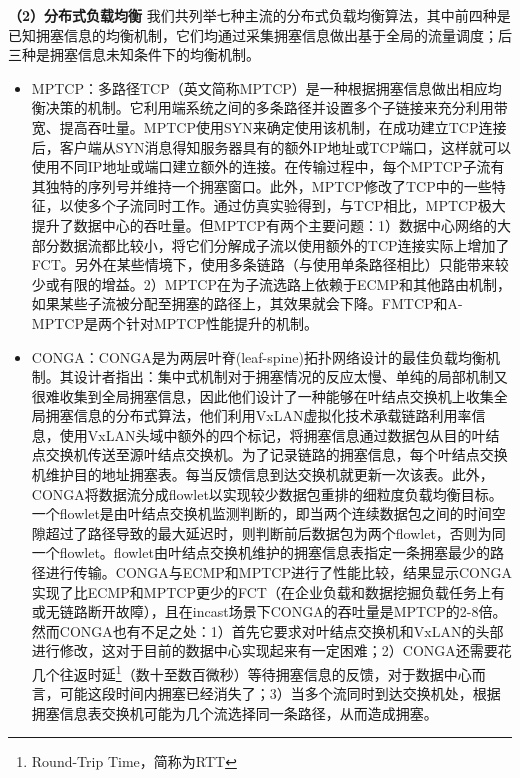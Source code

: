 \textbf{（2）分布式负载均衡}
我们共列举七种主流的分布式负载均衡算法，其中前四种是已知拥塞信息的均衡机制，它们均通过采集拥塞信息做出基于全局的流量调度；后三种是拥塞信息未知条件下的均衡机制。
\begin{itemize}
    \item MPTCP\cite{raiciu2011MPTCP}：多路径TCP（英文简称MPTCP）是一种根据拥塞信息做出相应均衡决策的机制。它利用端系统之间的多条路径并设置多个子链接来充分利用带宽、提高吞吐量。MPTCP使用SYN来确定使用该机制，在成功建立TCP连接后，客户端从SYN消息得知服务器具有的额外IP地址或TCP端口，这样就可以使用不同IP地址或端口建立额外的连接。在传输过程中，每个MPTCP子流有其独特的序列号并维持一个拥塞窗口。此外，MPTCP修改了TCP中的一些特征，以使多个子流同时工作。\cite{raiciu2011MPTCP}通过仿真实验得到，与TCP相比，MPTCP极大提升了数据中心的吞吐量。但MPTCP有两个主要问题：1）数据中心网络的大部分数据流都比较小，将它们分解成子流以使用额外的TCP连接实际上增加了FCT。另外在某些情境下，使用多条链路（与使用单条路径相比）只能带来较少或有限的增益。2）MPTCP在为子流选路上依赖于ECMP和其他路由机制，如果某些子流被分配至拥塞的路径上，其效果就会下降。FMTCP\cite{cui2015fmtcp}和A-MPTCP\cite{Coudron2013AMPTCP}是两个针对MPTCP性能提升的机制。
    \item CONGA\cite{alizadeh2014CONGA}：CONGA是为两层叶脊(leaf-spine)拓扑网络设计的最佳负载均衡机制。其设计者指出：集中式机制对于拥塞情况的反应太慢、单纯的局部机制又很难收集到全局拥塞信息，因此他们设计了一种能够在叶结点交换机上收集全局拥塞信息的分布式算法，他们利用VxLAN\cite{maha2014VxLAN}虚拟化技术承载链路利用率信息，使用VxLAN头域中额外的四个标记，将拥塞信息通过数据包从目的叶结点交换机传送至源叶结点交换机。为了记录链路的拥塞信息，每个叶结点交换机维护目的地址拥塞表。每当反馈信息到达交换机就更新一次该表。此外，CONGA将数据流分成flowlet以实现较少数据包重排的细粒度负载均衡目标。一个flowlet是由叶结点交换机监测判断的，即当两个连续数据包之间的时间空隙超过了路径导致的最大延迟时，则判断前后数据包为两个flowlet，否则为同一个flowlet。flowlet由叶结点交换机维护的拥塞信息表指定一条拥塞最少的路径进行传输。CONGA与ECMP和MPTCP进行了性能比较，结果显示CONGA实现了比ECMP和MPTCP更少的FCT（在企业负载和数据挖掘负载任务上有或无链路断开故障），且在incast场景下CONGA的吞吐量是MPTCP的2-8倍。然而CONGA也有不足之处：1）首先它要求对叶结点交换机和VxLAN的头部进行修改，这对于目前的数据中心实现起来有一定困难；2）CONGA还需要花几个往返时延\footnote{Round-Trip Time，简称为RTT}（数十至数百微秒）等待拥塞信息的反馈，对于数据中心而言，可能这段时间内拥塞已经消失了；3）当多个流同时到达交换机处，根据拥塞信息表交换机可能为几个流选择同一条路径，从而造成拥塞。
\begin{figure}[htb!]

\end{figure}
\end{itemize}
